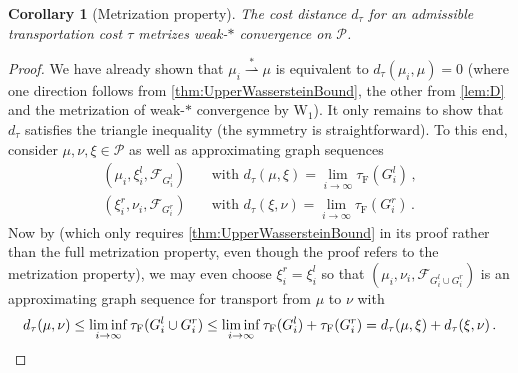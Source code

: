 \documentclass[10pt,a4paper,oneside,final]{article}
\newcommand{\prob}{{\mathcal{P}}}
\newcommand{\weakstarto}{\stackrel{*}{\rightharpoonup}}
\newcommand{\Wd}[1]{\mathrm{W}_{#1}}
\newcommand{\Wdone}{\Wd{1}}
\newcommand{\flux}{{\mathcal{F}}}
\newcommand{\JEnXia}[1][\tau]{#1_{\mathrm{F}}}%
\newcommand{\dtau}{d_\tau}
\numberwithin{equation}{section}
\theoremstyle{plain}
\newtheorem{corollary}[theorem]{Corollary}
\theoremstyle{definition}
\theoremstyle{remark}
\begin{document}
\begin{corollary}[Metrization property]\label{thm:metrization}
The cost distance $\dtau$ for an admissible transportation cost $\tau$ metrizes weak-$*$ convergence on $\prob$.
\end{corollary}
\begin{proof}
We have already shown that $\mu_i\weakstarto\mu$ is equivalent to $\dtau(\mu_i,\mu)=0$ (where one direction follows from \cref{thm:UpperWassersteinBound}, the other from \cref{lem:D} and the metrization of weak-$*$ convergence by $\Wdone$).
It only remains to show that $\dtau$ satisfies the triangle inequality (the symmetry is straightforward).
To this end, consider $\mu,\nu,\xi\in\prob$ as well as approximating graph sequences
\begin{align*}
(\mu_i,\xi_i^l,\flux_{G_i^l})&\quad\text{with }\dtau(\mu,\xi)=\lim_{i\to\infty}\JEnXia(G_i^l)\,,\\
(\xi_i^r,\nu_i,\flux_{G_i^r})&\quad\text{with }\dtau(\xi,\nu)=\lim_{i\to\infty}\JEnXia(G_i^r)\,.
\end{align*}
Now by \cite[Thm.\,18]{MaWi19} (which only requires \cref{thm:UpperWassersteinBound} in its proof rather than the full metrization property, even though the proof refers to the metrization property),
we may even choose $\xi_i^r=\xi_i^l$ so that $(\mu_i,\nu_i,\flux_{G_i^l\cup G_i^r})$ is an approximating graph sequence for transport from $\mu$ to $\nu$ with
\begin{equation*}
\dtau(\mu,\nu)\leq\liminf_{i\to\infty}\JEnXia(G_i^l\cup G_i^r)\leq\liminf_{i\to\infty}\JEnXia(G_i^l)+\JEnXia(G_i^r)=\dtau(\mu,\xi)+\dtau(\xi,\nu)\,.\qedhere
\end{equation*}
\end{proof}
\end{document}
